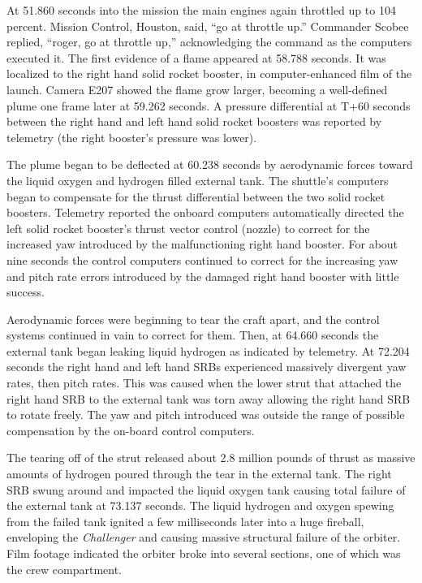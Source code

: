 At 51.860 seconds into the mission the main engines again
throttled up to 104 percent.
Mission Control, Houston, said, ``go at throttle up.''
Commander Scobee replied, ``roger, go at throttle up,''
acknowledging the command as the computers executed it.
The first evidence of a flame appeared at 58.788 seconds.
It was localized to the right hand solid rocket booster, in
computer-enhanced film of the launch.
Camera E207 showed the flame grow larger, becoming a
well-defined plume one frame later at 59.262 seconds.
A pressure differential at T+60 seconds between the right
hand and left hand solid rocket boosters was reported by
telemetry (the right booster's pressure was lower).

The plume began to be deflected at 60.238 seconds by
aerodynamic forces toward the liquid oxygen and hydrogen
filled external tank.
The shuttle's computers began to compensate for the thrust
differential between the two solid rocket boosters.
Telemetry reported the onboard computers automatically
directed the left solid rocket booster's thrust vector
control (nozzle) to correct for the increased yaw introduced
by the malfunctioning right hand booster.
For about nine seconds the control computers continued to
correct for the increasing yaw and pitch rate errors
introduced by the damaged right hand booster with little
success.

Aerodynamic forces were beginning to tear the craft apart,
and the control systems continued in vain to correct for
them.
Then, at 64.660 seconds the external tank began leaking
liquid hydrogen as indicated by telemetry.
At 72.204 seconds the right hand and left hand SRBs
experienced massively divergent yaw rates, then pitch rates.
This was caused when the lower strut that attached the right
hand SRB to the external tank was torn away allowing the
right hand SRB to rotate freely.
The yaw and pitch introduced was outside the range of
possible compensation by the on-board control computers.

The tearing off of the strut released about 2.8 million
pounds of thrust as massive amounts of hydrogen poured
through the tear in the external tank.  The right SRB swung
around and impacted the liquid oxygen tank causing total
failure of the external tank at 73.137 seconds.
The liquid hydrogen and oxygen spewing from the failed tank
ignited a few milliseconds later into a huge fireball,
enveloping the {\em Challenger} and causing massive
structural failure of the orbiter.  Film footage indicated
the orbiter broke into several sections, one of which was
the crew compartment.

